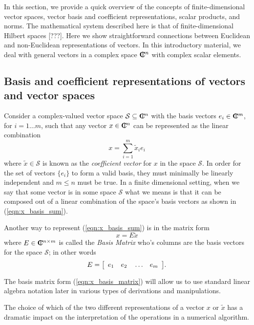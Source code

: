 \documentclass[pdf,ps2pdf,11pt]{SANDreport}
\begin{document}
In this section, we provide a quick overview of the concepts of
finite-dimensional vector spaces, vector basis and coefficient
representations, scalar products, and norms.  The mathematical system
described here is that of finite-dimensional Hilbert spaces [???].  Here we
show straightforward connections between Euclidean and non-Euclidean
representations of vectors.  In this introductory material, we deal with
general vectors in a complex space $\CPLX^n$ with complex scalar elements.

\subsection{Basis and coefficient representations of vectors and vector spaces}

Consider a complex-valued vector space $\mathcal{S} {}\subseteq {}\CPLX^n$ with
the basis vectors $e_i\in\CPLX^m$, for $i=1\ldots{}m$, such that any vector
$x\in\CPLX^n$ can be represented as the linear combination
%
\begin{equation}
x = \sum_{i=1}^{m} \tilde{x}_i e_i
\label{eqn:x_basis_sum}
\end{equation}
%
where $\tilde{x}\in\mathcal{S}$ is known as the {}\textit{coefficient vector}
for $x$ in the space $\mathcal{S}$.  In order for the set of vectors $\{e_i\}$
to form a valid basis, they must minimally be linearly independent and $m
{}\le n$ must be true.  In a finite dimensional setting, when we say that some
vector is in some space $\mathcal{S}$ what we means is that it can be composed
out of a linear combination of the space's basis vectors as shown in
(\ref{eqn:x_basis_sum}).

Another way to represent (\ref{eqn:x_basis_sum}) is in the matrix form
%
\begin{equation}
x = E \tilde{x}
\label{eqn:x_basis_matrix}
\end{equation}
%
where $E\in\CPLX^{n\times{}m}$ is called the {}\textit{Basis Matrix} who's
columns are the basis vectors for the space $\mathcal{S}$; in other words
%
\begin{equation}
E = {\bmat{cccc} e_1 & e_2 & {}\ldots & e_m {}\emat}.
\end{equation}
%

The basis matrix form (\ref{eqn:x_basis_matrix}) will allow us to use standard
linear algebra notation later in various types of derivations and
manipulations.

The choice of which of the two different representations of a vector $x$ or
$\tilde{x}$ has a dramatic impact on the interpretation of the operations in
a numerical algorithm.
\end{document}
